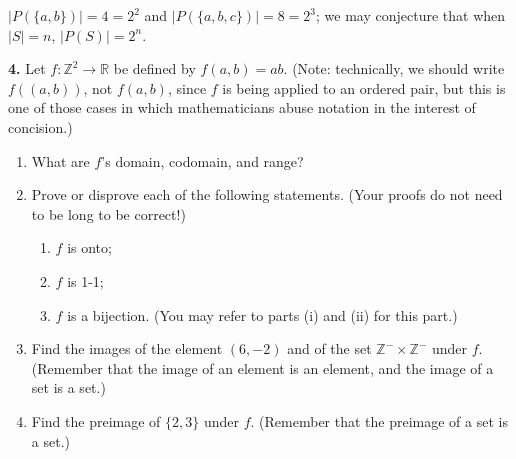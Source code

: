 \documentclass[10pt,]{book}
\theoremstyle{plain}
\theoremstyle{definition}
\theoremstyle{definition}
\theoremstyle{definition}
\theoremstyle{definition}
\numberwithin{equation}{section}
\def\Z{\mathbb{Z}}
\def\R{\mathbb{R}}
\begin{document}
      \(|P(\{a,b\})|=4=2^2\) and \(|P(\{a,b,c\})|=8=2^3\); we may conjecture that when \(|S|=n\), \(|P(S)|=2^n\).
\par\smallskip
\noindent\textbf{4.}\quad{}
        Let \(f: \Z^2 \to \R\) be defined by \(f(a,b)=ab\). (Note: technically, we should write \(f((a,b))\), not \(f(a,b)\), since \(f\) is being applied to an ordered pair, but this is one of those cases in which mathematicians abuse notation in the interest of concision.)
\leavevmode%
\begin{enumerate}[label=(\alph*)]
\item\hypertarget{li-39}{}
          What are \(f\)'s domain, codomain, and range?
\item\hypertarget{li-40}{}
          Prove or disprove each of the following statements. (Your proofs do not need to be long to be correct!)
%
\begin{enumerate}[label=\roman*.]
\item\hypertarget{li-41}{}
              \(f\) is onto;
\item\hypertarget{li-42}{}
              \(f\) is 1-1;
\item\hypertarget{li-43}{}
              \(f\) is a bijection. (You may refer to parts (i) and (ii) for this part.)
\end{enumerate}
\item\hypertarget{li-44}{}
          Find the images of the element \((6,-2)\) and of the set \(\Z^- \times \Z^-\) under \(f\). (Remember that the image of an element is an element, and the image of a set is a set.)
\item\hypertarget{li-45}{}
          Find the preimage of \(\{2,3\}\) under \(f\). (Remember that the preimage of a set is a set.)
\end{enumerate}
\par\smallskip
\leavevmode%
\end{document}
